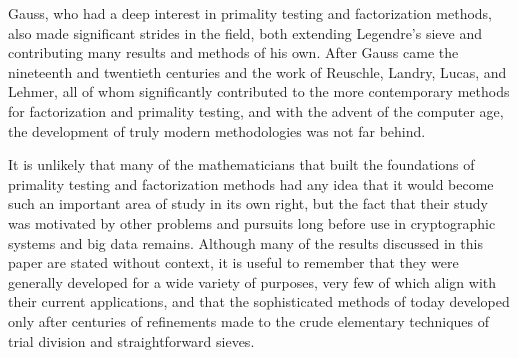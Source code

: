 \documentclass{article}
\begin{document}
\par Gauss, who had a deep interest in primality testing and factorization methods, also made significant strides in the field, both extending Legendre's sieve and contributing many results and methods of his own. After Gauss came the nineteenth and twentieth centuries and the work of Reuschle, Landry, Lucas, and Lehmer, all of whom significantly contributed to the more contemporary methods for factorization and primality testing, and with the advent of the computer age, the development of truly modern methodologies was not far behind. 
\par It is unlikely that many of the mathematicians that built the foundations of primality testing and factorization methods had any idea that it would become such an important area of study in its own right, but the fact that their study was motivated by other problems and pursuits long before use in cryptographic systems and big data remains. Although many of the results discussed in this paper are stated without context, it is useful to remember that they were generally developed for a wide variety of purposes, very few of which align with their current applications, and that the sophisticated methods of today developed only after centuries of refinements made to the crude elementary techniques of trial division and straightforward sieves.

 
\end{document}
